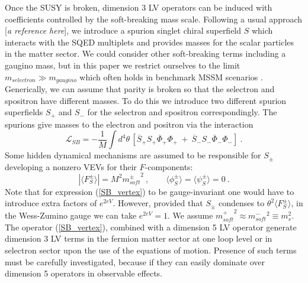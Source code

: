\documentclass[paper,12pt]{revtex4}
\begin{document}
Once the SUSY is broken, dimension 3 LV operators can be induced 
with coefficients controlled by the soft-breaking mass scale. 
	Following a usual approach [{\it a reference here}],
	we introduce a spurion singlet
	chiral superfield $ S $ which interacts with the SQED
	multiplets and provides masses for the scalar particles
	in the matter sector. We could consider other  
    soft-breaking terms including a gaugino mass, but in this paper we restrict
ourselves to the limit  $ m_{selectron} \gg m_{gaugino}$ which often holds in 
benchmark MSSM scenarios \cite{benchmark}.
	Generically, we can assume that parity is broken so that
	the selectron and spositron have different masses.
	To do this we introduce two different
	spurion superfields $ S_+ $ and $ S_- $
	for the selectron and spositron correspondingly.
	The spurions give masses to the electron and positron
	via the interaction
\begin{equation}
\label{SB_vertex}
  \mathcal{L}_{SB} = - \frac{1}{M} \int d^4\theta \, 
	\left[	\overline{S}_+ S_+ \overline{\Phi}_+ \Phi_+ 
		~+~
		\overline{S}_- S_- \overline{\Phi}_- \Phi_-
	\right] 
	~.
\end{equation}
	Some hidden dynamical mechanisms are assumed to be responsible 
    for  $ S_\pm $ developing a 
	nonzero VEVs for their $ F $-components:
	\[
	\left | \langle F^\pm_S \rangle \right | =
		M^2 {m^\pm_{soft}}^2~,\qquad 
		\langle\phi_S^\pm\rangle = 
		\langle\psi_S^\pm\rangle = 0~.
\]
	Note that for expression (\ref{SB_vertex}) to be 
	gauge-invariant one would have to introduce extra factors
	of $ e^{2eV} $. 
	However, provided that $ S_\pm $ condenses to 
	$ \theta^2 \langle F^\pm_S \rangle $,
	in the Wess-Zumino gauge we can take $e^{2eV}=1$.
	We assume 
	$ {m_{soft}^+}^2 \approx {m_{soft}^-}^2 \equiv m_s^2 $.
	The operator (\ref{SB_vertex}), 
	combined with a dimension 5 LV operator
	generate dimension 3 LV terms in the fermion matter sector at one loop level or 
 in selectron sector upon the use 
    of the equations of motion. 
	Presence of such terms must be carefully investigated, 
	because if they can easily dominate over dimension 5 operators
	in observable effects.
\end{document}
